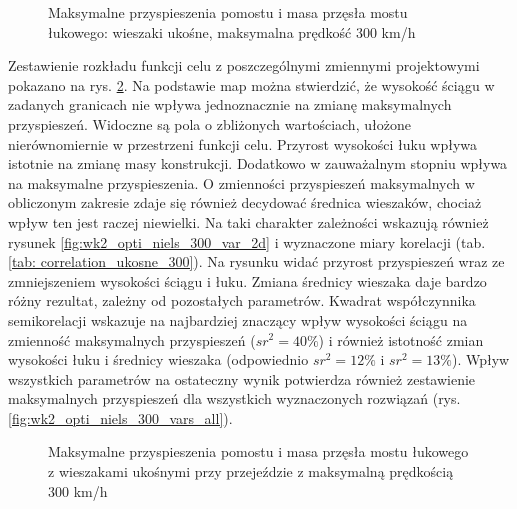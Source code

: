 \begin{figure}[hbt!]
	\centering
	\captionsetup{justification=centering}
	\caption{Maksymalne przyspieszenia pomostu i masa przęsła mostu łukowego: wieszaki ukośne, maksymalna prędkość 300 km/h}
	\label{fig:wk2_opti_niels_300_all}
\end{figure}

Zestawienie rozkładu funkcji celu z poszczególnymi zmiennymi projektowymi pokazano na rys. \ref{fig:wk2_opti_niels_300_variables}. Na podstawie map można stwierdzić, że wysokość ściągu w zadanych granicach nie wpływa jednoznacznie na zmianę maksymalnych przyspieszeń. Widoczne są pola o zbliżonych wartościach, ułożone nierównomiernie w przestrzeni funkcji celu. Przyrost wysokości łuku wpływa istotnie na zmianę masy konstrukcji. Dodatkowo w zauważalnym stopniu wpływa na maksymalne przyspieszenia. O zmienności przyspieszeń maksymalnych w obliczonym zakresie zdaje się również decydować średnica wieszaków, chociaż wpływ ten jest raczej niewielki. Na taki charakter zależności wskazują również rysunek \ref{fig:wk2_opti_niels_300_var_2d} i wyznaczone miary korelacji (tab. \ref{tab: correlation_ukosne_300}). Na rysunku widać przyrost przyspieszeń wraz ze zmniejszeniem wysokości ściągu i łuku. Zmiana średnicy wieszaka daje bardzo różny rezultat, zależny od pozostałych parametrów. Kwadrat współczynnika semikorelacji wskazuje na najbardziej znaczący wpływ wysokości ściągu na zmienność maksymalnych przyspieszeń ($sr^2=40\%$) i również istotność zmian wysokości łuku i średnicy wieszaka (odpowiednio $sr^2 = 12\%$ i $sr^2=13\%$). Wpływ wszystkich parametrów na ostateczny wynik potwierdza również zestawienie maksymalnych przyspieszeń dla wszystkich wyznaczonych rozwiązań (rys. \ref{fig:wk2_opti_niels_300_vars_all}).

\clearpage

\begin{figure}[hbt!]
	\centering
	\captionsetup{justification=centering}
	\caption{Maksymalne przyspieszenia pomostu i masa przęsła mostu łukowego z wieszakami ukośnymi przy przejeździe z maksymalną prędkością 300 km/h}
	\label{fig:wk2_opti_niels_300_variables}
\end{figure}

